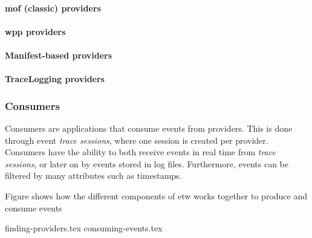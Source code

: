 \documentclass{report}
\begin{document}
\paragraph{\gls{mof} (classic) providers}

\paragraph{\gls{wpp} providers}

\paragraph{Manifest-based providers}

\paragraph{TraceLogging providers}

\subsubsection{Consumers}
Consumers are applications that consume events from providers. This is done through event \emph{trace sessions}, where one session is created per provider. Consumers have the ability to both receive events in real time from \emph{trace sessions}, or later on by events stored in log files. Furthermore, events can be filtered by many attributes such as timestamps.

Figure  shows how the different components of \gls{etw} works together to produce and consume events


{finding-providers.tex}
{consuming-events.tex}

\end{document}
